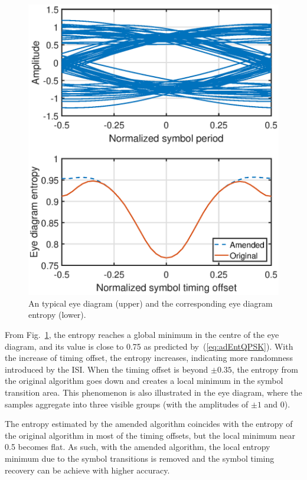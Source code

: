 \documentclass[journal,comsoc]{IEEEtran}
\begin{document}
\begin{figure}[htbp]
\centering
\includegraphics[width=3 in]{pic/timing.eps}
\caption{An typical eye diagram (upper) and the corresponding eye diagram entropy (lower).}
\label{fig:timing} 
\end{figure}

From Fig.~\ref{fig:timing}, the entropy reaches a global minimum in the centre of the eye diagram, and its value is close to 0.75 as predicted by~(\ref{eq:adEntQPSK}).
With the increase of timing offset, the entropy increases, indicating  more randomness introduced by the ISI.
When the timing offset is beyond $\pm 0.35$, the  entropy from the original algorithm goes down and creates a local minimum in the symbol transition area. 
This phenomenon is also illustrated in the eye diagram, where the samples aggregate into three visible groups (with the amplitudes of \(\pm 1\) and 0).

The entropy estimated by the amended algorithm coincides with the entropy of the original algorithm in most of the timing offsets, but the local minimum near 0.5 becomes flat.
As such, with the amended algorithm, the local entropy minimum due to the symbol transitions is removed and the symbol timing recovery can be achieve with higher accuracy.
\end{document}

